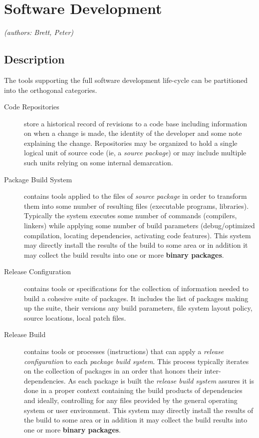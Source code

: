 \section{Software Development}

\textit{(authors: Brett, Peter)}

\subsection{Description}

The tools supporting the full software development life-cycle can be
partitioned into the orthogonal categories.

\begin{description}
\item[Code Repositories] store a historical record of revisions to a
  code base including information on when a change is made, the
  identity of the developer and some note explaining the change.
  Repositories may be organized to hold a single logical unit of
  source code (ie, a \textit{source package}) or may include multiple
  such units relying on some internal demarcation.

\item[Package Build System] contains tools applied to the files of
  \textit{source package} in order to transform them into some number
  of resulting files (executable programs, libraries).  Typically the
  system executes some number of commands (compilers, linkers) while
  applying some number of build parameters (debug/optimized
  compilation, locating dependencies, activating code features).  This
  system may directly install the results of the build to some area or
  in addition it may collect the build results into one or more
  \textbf{binary packages}.

\item[Release Configuration] contains tools or specifications for the
  collection of information needed to build a cohesive suite of
  packages.  It includes the list of packages making up the suite,
  their versions any build parameters, file system layout policy,
  source locations, local patch files.

\item[Release Build] contains tools or processes (instructions) that can
  apply a \textit{release configuration} to each \textit{package build
    system}.  This process typically iterates on the collection of
  packages in an order that honors their inter-dependencies.  As each
  package is built the \textit{release build system} assures it is
  done in a proper context containing the build products of
  dependencies and ideally, controlling for any files provided by the
  general operating system or user environment. This system may
  directly install the results of the build to some area or in
  addition it may collect the build results into one or more
  \textbf{binary packages}.


\end{description}
